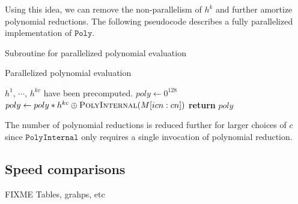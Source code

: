 \documentclass[hctr.tex]{subfiles}
\begin{document}
Using this idea, we can remove the non-parallelism of $h^k$ and further amortize polynomial reductions. The following pseudocode describes a fully parallelized implementation of $\texttt{Poly}$.
\begin{algorithm}[H]
\caption{Subroutine for parallelized polynomial evaluation}\label{polyalgsub}
\begin{algorithmic}[1]
	\Require $|Q| < nkc$
	\Require $h^1$, $\cdots$, $h^{kc}$ have been precomputed.
		\State $poly \gets 0^{128}$
		\State $nblocks \gets \lfloor |Q|/n \rfloor$
		\State $nstrides \gets \lfloor nblocks/c \rfloor$
		\State $C \gets 0^{128}$
		\State $D \gets 0^{128}$
		\State $E \gets 0^{128}$
			\State $e \gets nblocks - 1 - ci$
			\State $Alist \gets \{Q[nci + 0 : n], \cdots, Q[nci + n(k - 1) : n]\}$
			\State $Blist \gets \{h^{e}, \cdots, h^{e - k + 1}\}$
			\State $C', D', E' \gets \Call{KaratsubaStep1Parallel}{Alist, Blist}$}
			\State $C \gets C \oplus C'$
			\State $D \gets D \oplus D'$
			\State $E \gets E \oplus E'$
		\EndFor
		\For{$i = 0, i < nblocks \bmod c$}
			\State $e \gets nblocks - 1 - i$
			\State $C', D', E' \gets \Call{KaratsubaStep1}{Q[nc*nstrides + ni : n], h^{e}}$
			\State $C \gets C \oplus C'$
			\State $D \gets D \oplus D'$
			\State $E \gets E \oplus E'$
		\EndFor
		\State $P \gets \Call{KaratsubaStep2}{C, D, E}$
		\State $R \gets \Call{Barrett}{P}$
		\State \textbf{return} $R$
	\EndProcedure
\end{algorithmic}
\end{algorithm}

\begin{algorithm}[H]
\caption{Parallelized polynomial evaluation}\label{polyalg}
\begin{algorithmic}[1]
	\Require $h^1$, $\cdots$, $h^{kc}$ have been precomputed.
		\State $poly \gets 0^{128}$
			\State $poly \gets poly*h^{kc} \oplus \Call{PolyInternal}{M[icn : cn]}$
		\EndFor
		\State \textbf{return} $poly$
	\EndProcedure
\end{algorithmic}
\end{algorithm}
The number of polynomial reductions is reduced further for larger choices of $c$ since $\texttt{PolyInternal}$ only requires a single invocation of polynomial reduction.

\subsection{Speed comparisons}
{\color{red} FIXME Tables, grahps, etc}
\end{document}
